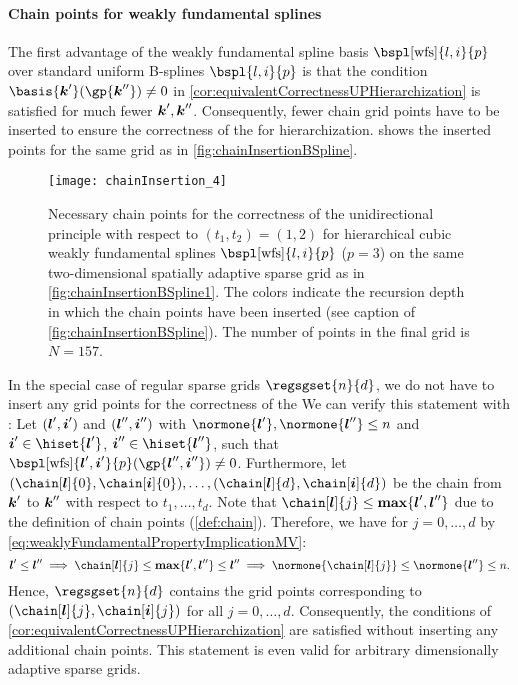 \paragraph{Chain points for weakly fundamental splines}

The first advantage of the
weakly fundamental spline basis $\bspl[\wfs]{l,i}{p}$
over standard uniform B-splines $\bspl{l,i}{p}$ is that
the condition $\basis{\*k'}(\gp{\*k''}) \not= 0$ in
\cref{cor:equivalentCorrectnessUPHierarchization} is
satisfied for much fewer ${\boldsymbol{k}}', {\boldsymbol{k}}''$.
Consequently, fewer chain grid points have to be inserted to
ensure the correctness of the \up for hierarchization.
 shows the inserted points
for the same grid as in \cref{fig:chainInsertionBSpline}.

\begin{SCfigure}
  \texttt{[image: chainInsertion\_4]}%
  \caption[%
    Chain points for hierarchical weakly fundamental splines on a
    sparse grid%
  ]{%
    Necessary chain points for the correctness of the unidirectional principle
    with respect to $(t_1, t_2) = (1, 2)$
    for hierarchical cubic weakly fundamental splines
    $\bspl[\wfs]{l,i}{p}$ ($p = 3$)
    on the same two-dimensional spatially adaptive sparse grid
    as in \cref{fig:chainInsertionBSpline1}.
    The colors indicate the recursion depth in which the
    chain points have been inserted
    (see caption of \cref{fig:chainInsertionBSpline}).
    The number of points in the final grid is $N = 157$.%
  }%
  \label{fig:chainInsertionWeaklyFundamentalSpline}%
\end{SCfigure}

In the special case of regular sparse grids $\regsgset{n}{d}$,
we do not have to insert any grid points for the correctness of the
\up{}
We can verify this statement with
:
Let $({\boldsymbol{l}}',{\boldsymbol{i}}')$ and $({\boldsymbol{l}}'',{\boldsymbol{i}}'')$ with
$\normone{\*l'}, \normone{\*l''} \le n$ and
$\*i' \in \hiset{\*l'}$, $\*i'' \in \hiset{\*l''}$,
such that $\bspl[\wfs]{\*l',\*i'}{p}(\gp{\*l'',\*i''}) \not= 0$.
Furthermore, let $(\chain[\*l]{0}, \chain[\*i]{0}), \dotsc,
(\chain[\*l]{d}, \chain[\*i]{d})$ be the chain
from ${\boldsymbol{k}}'$ to ${\boldsymbol{k}}''$ with respect to $t_1, \dotsc, t_d$.
Note that $\chain[\*l]{j} \le \vecmax\{\*l', \*l''\}$ due to the
definition of chain points (\cref{def:chain}).
Therefore, we have for $j = 0, \dotsc, d$
by \eqref{eq:weaklyFundamentalPropertyImplicationMV}:
\begin{equation}
\*l' \le \*l''
\implies
\chain[\*l]{j} \le \vecmax\{\*l', \*l''\} \le \*l''
\implies
\normone{\chain[\*l]{j}} \le \normone{\*l''} \le n.
\end{equation}
Hence, $\regsgset{n}{d}$ contains the grid points corresponding to
$(\chain[\*l]{j}, \chain[\*i]{j})$ for all $j = 0, \dotsc, d$.
Consequently, the conditions of
\cref{cor:equivalentCorrectnessUPHierarchization} are satisfied without
inserting any additional chain points.
This statement is even valid for arbitrary
dimensionally adaptive sparse grids.



